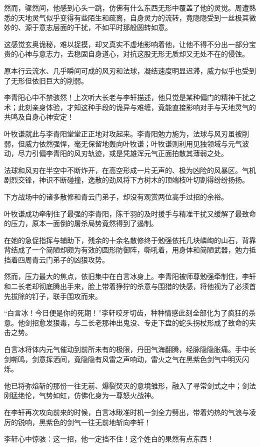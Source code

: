 然而，骤然间，他感到心头一跳，仿佛有什么东西无形中覆盖了他的灵觉。周遭熟悉的天地灵气似乎变得有些陌生和疏离，自身灵力的流转，竟隐隐受到一丝极其微妙的、源于意志层面的干扰，不如平时那般圆转如意。

这感觉玄奥诡秘，难以捉摸，却又真实不虚地影响着他，让他不得不分出一部分宝贵的心神与意志力，去稳固自身道心，对抗这股无形无质却又无处不在的侵蚀。

原本行云流水、几乎瞬间可成的风刃和法球，凝结速度明显迟滞，威力似乎也受到了无形但依旧巨大的削弱。

李青阳心中不禁骇然！上次听大长老与李轩描述，他只觉是某种偏门的精神干扰之术；此刻亲身体验，才知这种手段的诡异与难缠，竟能直接影响对手与天地灵气的共鸣及自身心神安定！

叶牧谦就此与李青阳堂堂正正地对攻起来。李青阳勉力施为，法球与风刃虽被削弱，但威力依然强悍，毫无保留地轰向叶牧谦；叶牧谦则利用见独领域与元气波动，尽力引偏李青阳的风刃轨迹，或是凭雄浑元气正面拍散其薄弱之处。

法球和风刃在半空中不断炸开，在高空形成一片无声的、极为凶险的风暴区。气机剧烈交锋，神识不断碰撞，逸散的劲风将下方树木的顶端枝叶切割得纷纷扬扬。

下方战场中的诸多散修和青云门弟子，却没有观赏两位高手过招的余裕。

叶牧谦成功牵制住了最强的李青阳，陈千羽的及时援手与精准干扰又缓解了最致命的压力，原本一面倒的屠杀局势竟然得到了遏制。

在她的急促指挥与辅助下，残余的十余名散修终于勉强依托几块嶙峋的山石，背靠背结成了一个简陋却颇为有效的圆形防御阵，嘶吼着，用身体和简陋武器，勉力抵挡着四周青云门弟子的凶狠攻势。

然而，压力最大的焦点，依旧集中在白言冰身上。李青阳被师尊勉强牵制住，李轩和二长老却彻底腾出手来，脸上带着狰狞的杀意与围猎的快感，将他视为了必须首先拔除的钉子，联手围攻而来。

“白言冰！今日便是你的死期！”李轩咬牙切齿，种种情感此刻全部化为了疯狂的杀意。他剑招愈发狠毒，与二长老那神出鬼没、专走下盘的蛇头拐杖形成了致命的夹击之势。

白言冰将体内元气催动到前所未有的极限，丹田气海翻腾，经脉隐隐胀痛。手中长剑嘶鸣，剑意挥洒间，竟隐隐有风雷之声响动，雷火之气在黑紫色剑气中明灭闪烁。

他已将弥焰斩的那份一往无前、爆裂焚灭的意境雏形，融入了寻常剑式之中；剑法刚猛绝伦，气势如虹，仿佛化身为一尊怒火战神。

在李轩再次攻向前来的时候，白言冰瞅准时机一剑全力劈出，带着灼热的气浪与凌厉的锐响，黑紫色的剑气一往无前地斩向李轩！

李轩心中惊骇：这一招，他一定挡不住！这个姓白的果然有点东西！

